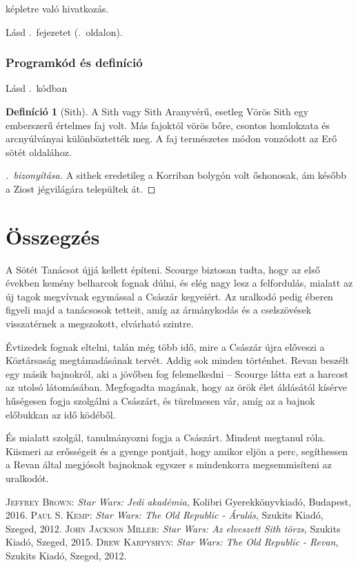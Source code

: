 \documentclass{thesis-ekf}
\theoremstyle{definition}
\newtheorem{definicio}{Definíció}[chapter]
\begin{document}
\Az{\eqref{eq-beadando}} képletre való hivatkozás.

Lásd \az{\ref{fejezet-coruscant}}.~fejezetet (\az{\pageref{fejezet-coruscant}}.~oldalon).
\subsection{Programkód és definíció}
	
	Lásd \az{\ref{kod-php}}.~kódban
	\begin{definicio}[Sith]\label{definicio-Sith}
		A Sith vagy Sith Aranyvérű, esetleg Vörös Sith egy emberszerű értelmes faj volt. Más fajoktól vörös bőre, csontos homlokzata és arcnyúlványai különböztették meg. A faj természetes módon vonzódott az Erő sötét oldalához.
	\end{definicio}
	\begin{proof}[\Az{\ref{definicio-Sith}}.~bizonyítása]
	A sithek eredetileg a Korriban bolygón volt őshonosak, ám később a Ziost jégvilágára települtek át.
	\end{proof}
\chapter*{Összegzés}
A Sötét Tanácsot újjá kellett építeni. Scourge biztosan tudta, hogy az első években kemény
belharcok fognak dúlni, és elég nagy lesz a felfordulás, mialatt az új tagok megvívnak
egymással a Császár kegyeiért. Az uralkodó pedig éberen figyeli majd a tanácsosok tetteit,
amíg az ármánykodás és a cselszövések visszatérnek a megszokott, elvárható szintre.
\cite{Drew}

Évtizedek fognak eltelni, talán még több idő, mire a Császár újra előveszi a Köztársaság
megtámadásának tervét. Addig sok minden történhet. Revan beszélt egy másik bajnokról, aki a
jövőben fog felemelkedni -- Scourge látta ezt a harcost az utolsó látomásában. Megfogadta
magának, hogy az örök élet áldásától kísérve hűségesen fogja szolgálni a Császárt, és
türelmesen vár, amíg az a bajnok előbukkan az idő ködéből.

És mialatt szolgál, tanulmányozni fogja a Császárt. Mindent megtanul róla. Kiismeri az
erősségeit és a gyenge pontjait, hogy amikor eljön a perc, segíthessen a Revan által megjósolt
bajnoknak egyszer s mindenkorra megsemmisíteni az uralkodót.

\begin{thebibliography}{4}
\textsc{Jeffrey Brown}: \emph{Star Wars: Jedi akadémia}, Kolibri Gyerekkönyvkiadó, Budapest, 2016.
\textsc{Paul S. Kemp}: \emph{Star Wars: The Old Republic - Árulás}, Szukits Kiadó, Szeged, 2012.
\textsc{John Jackson Miller}: \emph{Star Wars: Az elveszett Sith törzs}, Szukits Kiadó, Szeged, 2015.
\textsc{Drew Karpyshyn}: \emph{Star Wars: The Old Republic - Revan}, Szukits Kiadó, Szeged, 2012.
\end{thebibliography}


\end{document}
